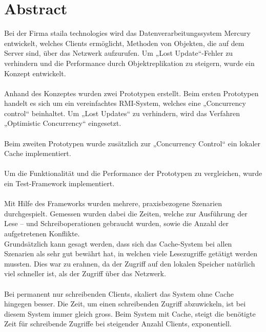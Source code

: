 \chapter*{Abstract}
Bei der Firma staila technologies wird das Datenverarbeitungssystem Mercury entwickelt, welches Clients ermöglicht, Methoden von Objekten, die auf dem Server sind, über das Netzwerk aufzurufen. Um „Lost Update“-Fehler zu verhindern und die Performance durch Objektreplikation zu steigern, wurde ein Konzept entwickelt.\\ \\
Anhand des Konzeptes wurden zwei Prototypen erstellt. Beim ersten Prototypen handelt es sich um ein vereinfachtes RMI-System, welches eine „Concurrency control“ beinhaltet. Um „Lost Updates“ zu verhindern, wird das Verfahren „Optimistic Concurrency“ eingesetzt. \\ \\
Beim zweiten Prototypen wurde zusätzlich zur „Concurrency Control“ ein lokaler Cache implementiert.\\ \\
Um die Funktionalität und die Performance der Prototypen zu vergleichen, wurde ein Test-Framework implementiert.\\ \\
Mit Hilfe des Frameworks wurden mehrere, praxisbezogene Szenarien durchgespielt. Gemessen wurden dabei die Zeiten, welche zur Ausführung der Lese – und Schreiboperationen gebraucht wurden, sowie die Anzahl der aufgetretenen Konflikte.\\
Grundsätzlich kann gesagt werden, dass sich das Cache-System bei allen Szenarien als sehr gut bewährt hat, in welchen viele Lesezugriffe getätigt werden mussten. Dies war zu erahnen, da der Zugriff auf den lokalen Speicher natürlich viel schneller ist, als der Zugriff über das Netzwerk.\\ \\
Bei permanent nur schreibenden Clients, skaliert das System ohne Cache hingegen besser. Die Zeit, um einen schreibenden Zugriff abzuwickeln, ist bei diesem System immer gleich gross. Beim System mit Cache, steigt die benötigte Zeit für schreibende Zugriffe bei steigender Anzahl Clients, exponentiell.
